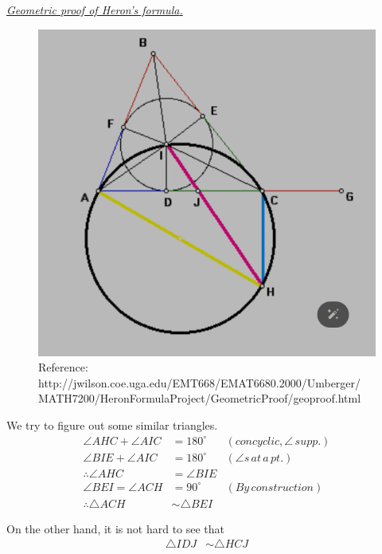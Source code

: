 \documentclass[12pt]{article}
\renewenvironment{proof}[1][Proof]{\begin{snugshade*} \underline{\textit{{#1}.}}\\}{\hfill \qedsymbol \end{snugshade*}}
\begin{document}
\begin{proof}[Geometric proof of Heron's formula]
        \begin{figure}[H]
            \centering
            \includegraphics[scale=1.5]{heron_circle.png}
            \caption{Reference: http://jwilson.coe.uga.edu/EMT668/EMAT6680.2000/Umberger/\\MATH7200/HeronFormulaProject/GeometricProof/geoproof.html}
        \end{figure}

        We try to figure out some similar triangles.\begin{align*}
            \angle AHC + \angle AIC &= 180^\circ &(concyclic, \angle \, supp.)\\
            \angle BIE + \angle AIC &= 180^\circ &(\angle s\, at\, a\, pt.)\\
            \therefore \angle AHC &= \angle BIE\\
            \angle BEI = \angle ACH &= 90^\circ &(By \, construction)\\
            \therefore \triangle ACH &\sim \triangle BEI
        \end{align*}

        On the other hand, it is not hard to see that \begin{align*}
            \triangle IDJ &\sim \triangle HCJ
        \end{align*}


\end{proof}
\end{document}

